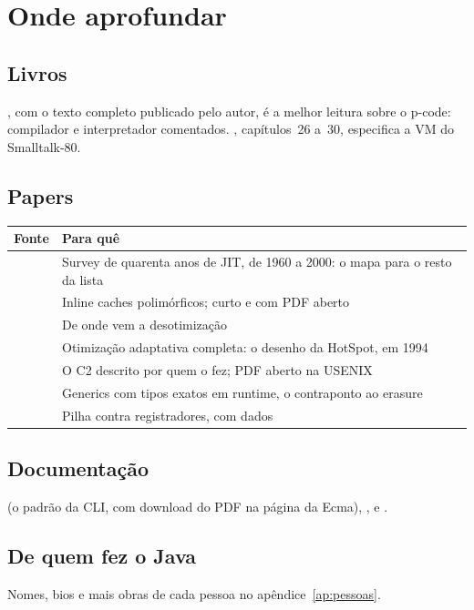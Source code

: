 \section{Onde aprofundar}

\subsection*{Livros}
 \parencite{livro:pemberton1982}, com o
texto completo publicado pelo autor, é a melhor leitura sobre o p-code:
compilador e interpretador comentados. 
\parencite{livro:goldberg1983}, capítulos~26 a~30, especifica a VM do
Smalltalk-80.

\subsection*{Papers}
\small
\begin{longtable}{@{}p{5.2cm} p{7cm}@{}}
\toprule
Fonte & Para quê \\
\midrule \endhead
\textcite{paper:aycock-history-jit} & Survey de quarenta anos de JIT,
  de 1960 a 2000: o mapa para o resto da lista \\
\textcite{paper:self-pics} & Inline caches polimórficos; curto e com PDF
  aberto \\
\textcite{paper:self-deoptimization} & De onde vem a desotimização \\
\textcite{paper:holzle-thesis-adaptive-optimization} & Otimização
  adaptativa completa: o desenho da HotSpot, em 1994 \\
\textcite{paper:hotspot-server-compiler} & O C2 descrito por quem o
  fez; PDF aberto na USENIX \\
\textcite{paper:clr-generics} & Generics com tipos exatos em runtime, o
  contraponto ao erasure \\
\textcite{paper:vm-showdown} & Pilha contra registradores, com dados \\
\bottomrule
\end{longtable}
\normalsize

\subsection*{Documentação}
 (o padrão da CLI, com download do PDF na página
da Ecma), ,
 e .

\subsection*{De quem fez o Java}
Nomes, bios e mais obras de cada pessoa no apêndice~\ref{ap:pessoas}.
\begin{itemize}
\end{itemize}

